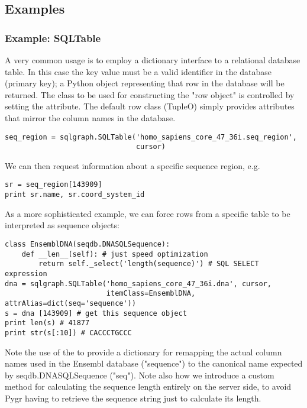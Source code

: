 \documentclass{howto}
\begin{document}
\begin{itemize}
\subsection{Examples}
\subsubsection{Example: SQLTable}
A very common usage is to employ a dictionary interface to a relational
database table.  In this case the key value must be a valid identifier
in the database (primary key); a Python object representing that row in the database
will be returned.  The class to be used for constructing the "row object"
is controlled by setting the  attribute.  The default
row class (TupleO) simply provides attributes that mirror the column names
in the database.
\begin{verbatim}
seq_region = sqlgraph.SQLTable('homo_sapiens_core_47_36i.seq_region',
                               cursor) 
\end{verbatim}
We can then request information about a specific sequence region, e.g.
\begin{verbatim}
sr = seq_region[143909]
print sr.name, sr.coord_system_id
\end{verbatim}

As a more sophisticated example, we can force rows from a specific table
to be interpreted as sequence objects:
\begin{verbatim}
class EnsemblDNA(seqdb.DNASQLSequence):
    def __len__(self): # just speed optimization
        return self._select('length(sequence)') # SQL SELECT expression
dna = sqlgraph.SQLTable('homo_sapiens_core_47_36i.dna', cursor, 
                        itemClass=EnsemblDNA, attrAlias=dict(seq='sequence'))
s = dna [143909] # get this sequence object
print len(s) # 41877
print str(s[:10]) # CACCCTGCCC
\end{verbatim}
Note the use of the  to provide a dictionary for remapping
the actual column names used in the Ensembl database ("sequence") to the
canonical name expected by seqdb.DNASQLSequence ("seq").  Note also how
we introduce a custom method for calculating the sequence length entirely on
the server side, to avoid Pygr having to retrieve the sequence string just to 
calculate its length.



\end{itemize}
\end{document}
